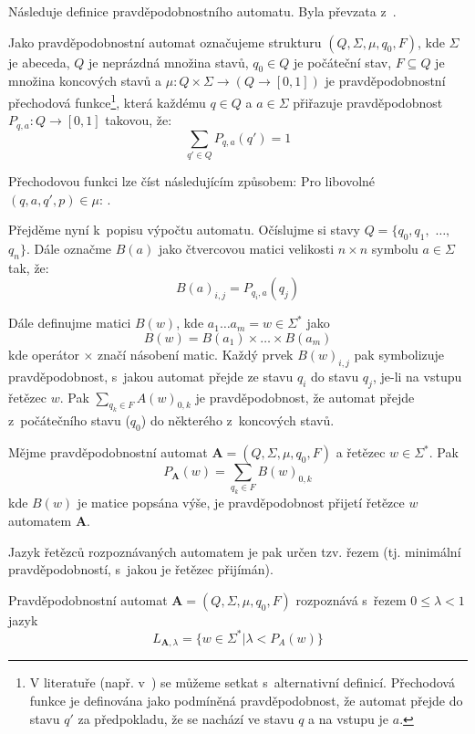 Následuje definice pravděpodobnostního automatu. Byla převzata z~\cite{Rab-ProbAut}.
\begin{definition}
 Jako pravděpodobnostní automat označujeme strukturu $(Q, \Sigma, \mu, q_0, F)$, kde $\Sigma$ je abeceda, $Q$ je neprázdná množina stavů, $q_0 \in Q$ je počáteční stav, $F \subseteq Q$ je množina koncových stavů a $\mu: Q \times \Sigma \rightarrow (Q \rightarrow [0,1])$ je pravděpodobnostní přechodová funkce\footnote{V literatuře (např. v~\cite{San-ReaFuzLanProMaxMaxAut}) se můžeme setkat s~alternativní definicí. Přechodová funkce je definována jako podmíněná pravděpodobnost, že automat přejde do stavu $q'$ za předpokladu, že se nachází ve stavu $q$ a na vstupu je $a$.}, která každému $q \in Q$ a $a \in \Sigma$ přiřazuje pravděpodobnost $P_{q,a}: Q \rightarrow [0,1]$ takovou, že:
 $$   
  \sum_{q' \in Q} P_{q, a}(q') = 1 
 $$
\end{definition}

Přechodovou funkci lze číst následujícím způsobem: Pro libovolné $(q, a, q', p) \in \mu$: .

Přejděme nyní k~popisu výpočtu automatu. Očíslujme si stavy $Q = \{ q_0, q_1,$ $\dots,$ $q_n \}$. Dále označme $B(a)$ jako čtvercovou matici velikosti $n \times n$ symbolu $a \in \Sigma$ tak, že:
$$
  B(a)_{i, j} = P_{q_i, a}(q_j)
$$

Dále definujme matici $B(w)$, kde $a_1 \dots a_m = w \in \Sigma^*$ jako
$$
  B(w) = B(a_1) \times \dots \times B(a_m)
$$
kde operátor $\times$ značí násobení matic. Každý prvek $B(w)_{i,j}$ pak symbolizuje pravděpodobnost, s~jakou automat přejde ze stavu $q_i$ do stavu $q_j$, je-li na vstupu řetězec $w$. Pak $\sum_{q_k \in F} A(w)_{0, k}$ je pravděpodobnost, že automat přejde z~počátečního stavu ($q_0$) do některého z~koncových stavů.

\begin{definition}
 Mějme pravděpodobnostní automat $\mathbf{A} = (Q, \Sigma, \mu, q_0, F)$ a řetězec $w \in \Sigma^*$. Pak 
 $$
  P_\mathbf{A}(w) = \sum_{q_k \in F} B(w)_{0, k}
 $$ 
 kde $B(w)$ je matice popsána výše, je pravděpodobnost přijetí řetězce $w$ automatem $\mathbf{A}$.
\end{definition}

Jazyk řetězců rozpoznávaných automatem je pak určen tzv. řezem (tj. minimální pravděpodobností, s~jakou je řetězec přijímán).
\begin{definition}
 Pravděpodobnostní automat $\mathbf{A} = (Q, \Sigma, \mu, q_0, F)$ rozpoznává s~řezem $0 \leq \lambda < 1$ jazyk
 $$
  L_{\mathbf{A},\lambda} = \{ w \in \Sigma^* | \lambda < P_A(w) \}
 $$
\end{definition}

